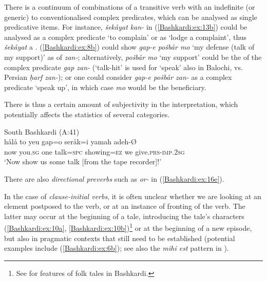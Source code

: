 \documentclass[output=paper,colorlinks,citecolor=brown]{langscibook}
\begin{document}
There is a continuum of combinations of a transitive verb with an indefinite (or generic)  to conventionalised complex predicates, which can be analysed as single predicative items. For instance, \textit{šekåyat kan-} in (\ref{Bashkardi:ex:13b}) could be analysed as a complex predicate `to complain' or as `lodge a complaint', thus \textit{šekåyat} a . (\ref{Bashkardi:ex:8b}) could show \textit{gap-e pošbår mo} `my defense (talk of my support)' as  of \textit{zan-}; alternatively, \textit{pošbår mo} `my support' could be the  of the complex predicate \textit{gap zan-} (`talk-hit' is used for `speak' also in Balochi, vs. Persian \textit{ḥarf zan-}); or one could consider \textit{gap-e pošbår zan-} as a complex predicate `speak up', in which case \textit{mo} would be the beneficiary.

There is thus a certain amount of subjectivity in the interpretation, which potentially affects the statistics of several categories. 


\ea\label{Bashkardi:ex:9}\setcounter{mpFootnoteValueSaver}{\value{footnote}}
South Bashkardi (A:41) \\
\gll hålå to yeu gap=o seråk=i yamah adeh\textup{-\O} \\
now you\textsc{.sg} one talk\textsc{=spc} showing\textsc{=ez} we{\footnotemark} give\textsc{.prs}\footnotemark\textsc{-imp}\textsc{.2sg} \\
\glt `Now show us some talk [from the tape recorder]!'
\z

%
%
%


There are also \emph{directional preverbs} such as \textit{or-} in (\ref{Bashkardi:ex:16e}).

In the case of \emph{clause-initial verbs}, it is often unclear whether we are looking at an element postposed to the verb, or at an instance of fronting of the verb. The latter may occur at the beginning of a tale, introducing the tale's characters (\ref{Bashkardi:ex:10a}, \ref{Bashkardi:ex:10b})\footnote{
See \citet{korn_once_2020} for features of folk tales in Bashkardi.
} or at the beginning of a new episode, but also in pragmatic contexts that still need to be established (potential examples include (\ref{Bashkardi:ex:6b}); see also the \textit{mihi est} pattern in ).
\end{document}
